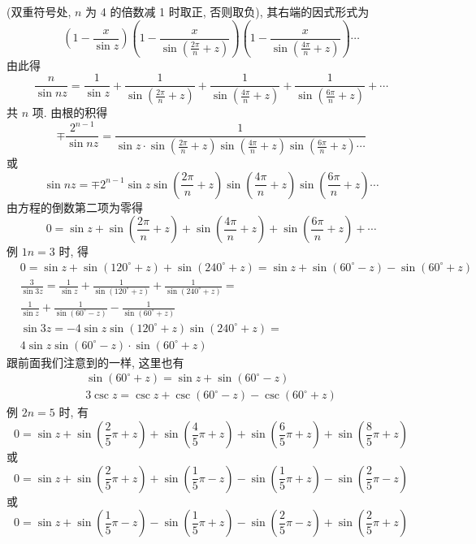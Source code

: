 (双重符号处, $n$ 为 4 的倍数减 1 时取正, 否则取负), 其右端的因式形式为
\[
\left(1-\frac{x}{\sin z}\right)\left(1-\frac{x}{\sin \left(\frac{2 \pi}{n}+z\right)}\right)\left(1-\frac{x}{\sin \left(\frac{4 \pi}{n}+z\right)}\right) \cdots
\]
由此得
\[
\frac{n}{\sin n z}=\frac{1}{\sin z}+\frac{1}{\sin \left(\frac{2 \pi}{n}+z\right)}+\frac{1}{\sin \left(\frac{4 \pi}{n}+z\right)}+\frac{1}{\sin \left(\frac{6 \pi}{n}+z\right)}+\cdots
\]
共 $n$ 项. 由根的积得
\[
\mp \frac{2^{n-1}}{\sin n z}=\frac{1}{\sin z \cdot \sin \left(\frac{2 \pi}{n}+z\right) \sin \left(\frac{4 \pi}{n}+z\right) \sin \left(\frac{6 \pi}{n}+z\right) \cdots}
\]
或
\[
\sin n z=\mp 2^{n-1} \sin z \sin \left(\frac{2 \pi}{n}+z\right) \sin \left(\frac{4 \pi}{n}+z\right) \sin \left(\frac{6 \pi}{n}+z\right) \cdots
\]
由方程的倒数第二项为零得
\[
0=\sin z+\sin \left(\frac{2 \pi}{n}+z\right)+\sin \left(\frac{4 \pi}{n}+z\right)+\sin \left(\frac{6 \pi}{n}+z\right)+\cdots
\]
例 $1 n=3$ 时, 得
\[
\begin{aligned}
& 0=\sin z+\sin \left(120^{\circ}+z\right)+\sin \left(240^{\circ}+z\right)=\sin z+\sin \left(60^{\circ}-z\right)-\sin \left(60^{\circ}+z\right) \\
& \frac{3}{\sin 3 z}=\frac{1}{\sin z}+\frac{1}{\sin \left(120^{\circ}+z\right)}+\frac{1}{\sin \left(240^{\circ}+z\right)}= \\
& \frac{1}{\sin z}+\frac{1}{\sin \left(60^{\circ}-z\right)}-\frac{1}{\sin \left(60^{\circ}+z\right)} \\
& \sin 3 z=-4 \sin z \sin \left(120^{\circ}+z\right) \sin \left(240^{\circ}+z\right)= \\
& 4 \sin z \sin \left(60^{\circ}-z\right) \cdot \sin \left(60^{\circ}+z\right)
\end{aligned}
\]
跟前面我们注意到的一样, 这里也有
\[
\begin{gathered}
\sin \left(60^{\circ}+z\right)=\sin z+\sin \left(60^{\circ}-z\right) \\
3 \csc z=\csc z+\csc \left(60^{\circ}-z\right)-\csc \left(60^{\circ}+z\right)
\end{gathered}
\]
例 $2 n=5$ 时, 有
\[
0=\sin z+\sin \left(\frac{2}{5} \pi+z\right)+\sin \left(\frac{4}{5} \pi+z\right)+\sin \left(\frac{6}{5} \pi+z\right)+\sin \left(\frac{8}{5} \pi+z\right)
\]
或
\[
0=\sin z+\sin \left(\frac{2}{5} \pi+z\right)+\sin \left(\frac{1}{5} \pi-z\right)-\sin \left(\frac{1}{5} \pi+z\right)-\sin \left(\frac{2}{5} \pi-z\right)
\]
或
\[
0=\sin z+\sin \left(\frac{1}{5} \pi-z\right)-\sin \left(\frac{1}{5} \pi+z\right)-\sin \left(\frac{2}{5} \pi-z\right)+\sin \left(\frac{2}{5} \pi+z\right)
\]
